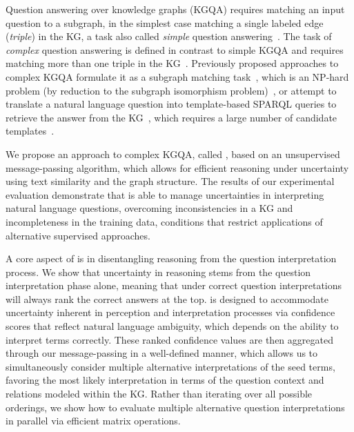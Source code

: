 Question answering over knowledge graphs (KGQA) requires matching an input question to a subgraph, in the simplest case matching a single labeled edge (\emph{triple}) in the KG, a task also called \emph{simple} question answering~\cite{DBLP:journals/corr/BordesUCW15}.
The task of \emph{complex} question answering is defined in contrast to simple KGQA and requires matching more than one triple in the KG~\cite{DBLP:conf/semweb/TrivediMDL17}.
Previously proposed approaches to complex KGQA formulate it as a subgraph matching task~\cite{DBLP:conf/coling/BaoDYZZ16,maheshwari2018learning,DBLP:conf/coling/SorokinG18}, which is an NP-hard problem (by reduction to the subgraph isomorphism problem)~\cite{DBLP:conf/sigmod/ZouHWYHZ14}, or attempt to translate a natural language question into template-based SPARQL queries to retrieve the answer from the KG~\cite{DBLP:journals/corr/abs-1803-00832}, which requires a large number of candidate templates~\cite{DBLP:journals/corr/abs-1809-10044}.

We propose an approach to complex KGQA, called \OurApproach{}, based on an unsupervised message-passing algorithm, which allows for efficient reasoning under uncertainty using text similarity and the graph structure.
The results of our experimental evaluation demonstrate that \OurApproach{} is able to manage uncertainties in interpreting natural language questions, overcoming inconsistencies in a KG and incompleteness in the training data, conditions that restrict applications of alternative supervised approaches.

A core aspect of \OurApproach{} is in disentangling reasoning from the question interpretation process.
We show that uncertainty in reasoning stems from the question interpretation phase alone, meaning that under correct question interpretations \OurApproach{} will always rank the correct answers at the top.
\OurApproach{} is designed to accommodate uncertainty inherent in perception and interpretation processes via confidence scores that reflect natural language ambiguity, which %
depends on the ability to interpret terms correctly.
These ranked confidence values are then aggregated through our message-passing in a well-defined manner, which allows us to simultaneously consider multiple alternative interpretations of the seed terms, favoring the most likely interpretation in terms of the question context and relations modeled within the KG.
Rather than iterating over all possible orderings, we show how to evaluate multiple alternative question interpretations in parallel via efficient matrix operations.

